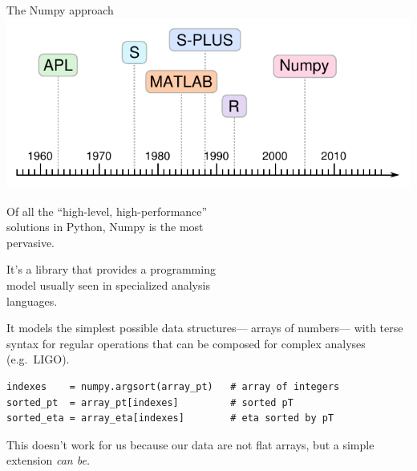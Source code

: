 \documentclass[aspectratio=169]{beamer}
\begin{document}
\begin{frame}[fragile]{The Numpy approach}
\vspace{0.5 cm}
\hfill \includegraphics[height=3 cm]{apl-timeline.pdf}

\vspace{-3 cm}
Of all the ``high-level, high-performance'' \\
solutions in Python, Numpy is the most \\
pervasive.

\vspace{0.5 cm}
It's a library that provides a programming \\
model usually seen in specialized analysis \\
languages.

\vspace{0.5 cm}
It models the simplest possible data structures--- arrays of numbers--- with terse syntax for regular operations that can be composed for complex analyses (e.g.\ LIGO).

\small
\begin{center}
\begin{minipage}{0.9\linewidth}
\begin{verbatim}
indexes    = numpy.argsort(array_pt)   # array of integers
sorted_pt  = array_pt[indexes]         # sorted pT
sorted_eta = array_eta[indexes]        # eta sorted by pT
\end{verbatim}
\end{minipage}
\end{center}

This doesn't work for us because our data are not flat arrays, but a simple extension {\it can be.}
\end{frame}
\end{document}
